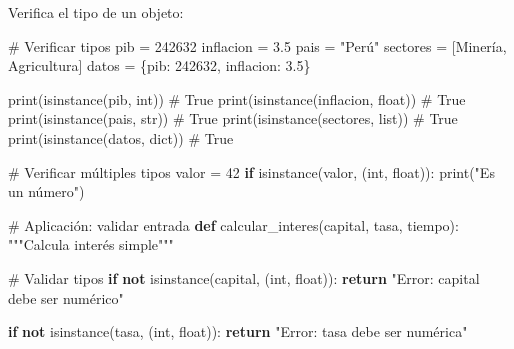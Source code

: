 \documentclass[
  doc,
  floatsintext,
  longtable,
  a4paper,
  nolmodern,
  notxfonts,
  notimes,
  12pt,
  colorlinks=true,linkcolor=blue,citecolor=blue,urlcolor=blue]{apa7}
\newenvironment{Shaded}{\begin{snugshade}}{\end{snugshade}}
\newcommand{\BuiltInTok}[1]{\textcolor[rgb]{0.00,0.23,0.31}{#1}}
\newcommand{\CommentTok}[1]{\textcolor[rgb]{0.37,0.37,0.37}{#1}}
\newcommand{\ControlFlowTok}[1]{\textcolor[rgb]{0.00,0.23,0.31}{\textbf{#1}}}
\newcommand{\DecValTok}[1]{\textcolor[rgb]{0.68,0.00,0.00}{#1}}
\newcommand{\FloatTok}[1]{\textcolor[rgb]{0.68,0.00,0.00}{#1}}
\newcommand{\KeywordTok}[1]{\textcolor[rgb]{0.00,0.23,0.31}{\textbf{#1}}}
\newcommand{\NormalTok}[1]{\textcolor[rgb]{0.00,0.23,0.31}{#1}}
\newcommand{\OperatorTok}[1]{\textcolor[rgb]{0.37,0.37,0.37}{#1}}
\newcommand{\StringTok}[1]{\textcolor[rgb]{0.13,0.47,0.30}{#1}}
\begin{document}
Verifica el tipo de un objeto:

\begin{Shaded}
\begin{Highlighting}[]
\CommentTok{\# Verificar tipos}
\NormalTok{pib }\OperatorTok{=} \DecValTok{242632}
\NormalTok{inflacion }\OperatorTok{=} \FloatTok{3.5}
\NormalTok{pais }\OperatorTok{=} \StringTok{"Perú"}
\NormalTok{sectores }\OperatorTok{=}\NormalTok{ [}\StringTok{\textquotesingle{}Minería\textquotesingle{}}\NormalTok{, }\StringTok{\textquotesingle{}Agricultura\textquotesingle{}}\NormalTok{]}
\NormalTok{datos }\OperatorTok{=}\NormalTok{ \{}\StringTok{\textquotesingle{}pib\textquotesingle{}}\NormalTok{: }\DecValTok{242632}\NormalTok{, }\StringTok{\textquotesingle{}inflacion\textquotesingle{}}\NormalTok{: }\FloatTok{3.5}\NormalTok{\}}

\BuiltInTok{print}\NormalTok{(}\BuiltInTok{isinstance}\NormalTok{(pib, }\BuiltInTok{int}\NormalTok{))           }\CommentTok{\# True}
\BuiltInTok{print}\NormalTok{(}\BuiltInTok{isinstance}\NormalTok{(inflacion, }\BuiltInTok{float}\NormalTok{))   }\CommentTok{\# True}
\BuiltInTok{print}\NormalTok{(}\BuiltInTok{isinstance}\NormalTok{(pais, }\BuiltInTok{str}\NormalTok{))          }\CommentTok{\# True}
\BuiltInTok{print}\NormalTok{(}\BuiltInTok{isinstance}\NormalTok{(sectores, }\BuiltInTok{list}\NormalTok{))     }\CommentTok{\# True}
\BuiltInTok{print}\NormalTok{(}\BuiltInTok{isinstance}\NormalTok{(datos, }\BuiltInTok{dict}\NormalTok{))        }\CommentTok{\# True}

\CommentTok{\# Verificar múltiples tipos}
\NormalTok{valor }\OperatorTok{=} \DecValTok{42}
\ControlFlowTok{if} \BuiltInTok{isinstance}\NormalTok{(valor, (}\BuiltInTok{int}\NormalTok{, }\BuiltInTok{float}\NormalTok{)):}
    \BuiltInTok{print}\NormalTok{(}\StringTok{"Es un número"}\NormalTok{)}

\CommentTok{\# Aplicación: validar entrada}
\KeywordTok{def}\NormalTok{ calcular\_interes(capital, tasa, tiempo):}
    \CommentTok{"""Calcula interés simple"""}
    
    \CommentTok{\# Validar tipos}
    \ControlFlowTok{if} \KeywordTok{not} \BuiltInTok{isinstance}\NormalTok{(capital, (}\BuiltInTok{int}\NormalTok{, }\BuiltInTok{float}\NormalTok{)):}
        \ControlFlowTok{return} \StringTok{"Error: capital debe ser numérico"}
    
    \ControlFlowTok{if} \KeywordTok{not} \BuiltInTok{isinstance}\NormalTok{(tasa, (}\BuiltInTok{int}\NormalTok{, }\BuiltInTok{float}\NormalTok{)):}
        \ControlFlowTok{return} \StringTok{"Error: tasa debe ser numérica"}
    

\end{Highlighting}
\end{Shaded}
\end{document}
